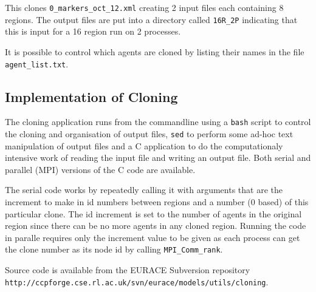 This clones \texttt{0\_markers\_oct\_12.xml} creating 2 input files each containing 8 regions. The output files are put into a directory called \texttt{16R\_2P} indicating that this is input for a 16 region run on 2 processes.

It is possible to control which agents are cloned by listing their names in the file \texttt{agent\_list.txt}.

\subsection{Implementation of Cloning}

The cloning application runs from the commandline using a \texttt{bash} script to control the cloning and organisation of output files, \texttt{sed} to perform some ad-hoc text manipulation of output files and a C application to do the computationaly intensive work of reading the input file and writing an output file. Both serial and parallel (MPI) versions of the C code are available.

The serial code works by repeatedly calling it with arguments that are the increment to make in id numbers between regions and a number (0 based) of this particular clone. The id increment is set to the number of agents in the original region since there can be no more agents in any cloned region. Running the code in paralle requires only the increment value to be given as each process can get the clone number as its node id by calling \texttt{MPI\_Comm\_rank}.

{\raggedright Source code is available from the EURACE Subversion repository \break \verb+http://ccpforge.cse.rl.ac.uk/svn/eurace/models/utils/cloning+.}
